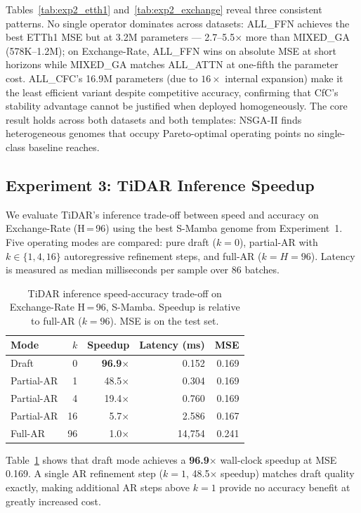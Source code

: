 Tables~\ref{tab:exp2_etth1} and~\ref{tab:exp2_exchange} reveal three consistent patterns.
No single operator dominates across datasets: ALL\_FFN achieves the best ETTh1 MSE but at 3.2M parameters — 2.7--5.5$\times$ more than MIXED\_GA (578K--1.2M); on Exchange-Rate, ALL\_FFN wins on absolute MSE at short horizons while MIXED\_GA matches ALL\_ATTN at one-fifth the parameter cost.
ALL\_CFC's 16.9M parameters (due to $16{\times}$ internal expansion) make it the least efficient variant despite competitive accuracy, confirming that CfC's stability advantage cannot be justified when deployed homogeneously.
The core result holds across both datasets and both templates: NSGA-II finds heterogeneous genomes that occupy Pareto-optimal operating points no single-class baseline reaches.

\subsection{Experiment 3: TiDAR Inference Speedup}
\label{sec:tidar_speedup}

We evaluate TiDAR's inference trade-off between speed and accuracy on Exchange-Rate (H\,=\,96) using the best S-Mamba genome from Experiment~1.
Five operating modes are compared: pure draft ($k=0$), partial-AR with $k \in \{1, 4, 16\}$ autoregressive refinement steps, and full-AR ($k=H=96$).
Latency is measured as median milliseconds per sample over 86 batches.

\begin{table}[t]
\caption{TiDAR inference speed-accuracy trade-off on Exchange-Rate H\,=\,96, S-Mamba. Speedup is relative to full-AR ($k=96$). MSE is on the test set.}
\label{tab:exp4}
\centering
\small
\begin{tabular}{lrrrr}
\toprule
Mode & $k$ & Speedup & Latency (ms) & MSE \\
\midrule
Draft         & 0  & \textbf{96.9$\times$} & 0.152  & 0.169 \\
Partial-AR    & 1  & 48.5$\times$          & 0.304  & 0.169 \\
Partial-AR    & 4  & 19.4$\times$          & 0.760  & 0.169 \\
Partial-AR    & 16 & 5.7$\times$           & 2.586  & 0.167 \\
Full-AR       & 96 & 1.0$\times$           & 14{,}754 & 0.241 \\
\bottomrule
\end{tabular}
\end{table}

Table~\ref{tab:exp4} shows that draft mode achieves a \textbf{96.9$\times$} wall-clock speedup at MSE 0.169.
A single AR refinement step ($k=1$, 48.5$\times$ speedup) matches draft quality exactly, making additional AR steps above $k=1$ provide no accuracy benefit at greatly increased cost.

